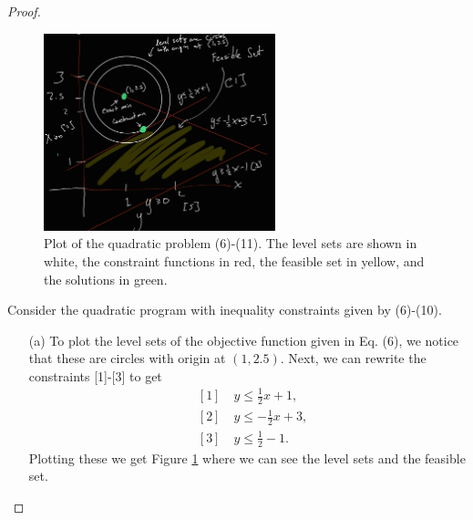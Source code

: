 \documentclass[12pt]{report}
\begin{document}
\begin{problem}
\begin{proof}
\begin{figure}
    \centering
    \includegraphics[width=0.6\textwidth,height=\textwidth,keepaspectratio]{plot.jpg}
    \caption{Plot of the quadratic problem (6)-(11). The level sets are shown in white, the constraint functions in red, the feasible set in yellow, and the solutions in green.}
    \label{fig}
\end{figure}
Consider the quadratic program with inequality constraints given by (6)-(10).
\begin{enumerate}
    \item [(a)]
    To plot the level sets of the objective function given in Eq. (6), we notice that these are circles with origin at $(1,2.5)$. Next, we can rewrite the constraints [1]-[3] to get
    \begin{align*}
        &[1] \quad y \leq \frac{1}{2}x + 1,\\
        &[2] \quad y \leq -\frac{1}{2}x + 3,\\
        &[3] \quad y \leq \frac{1}{2}-1.
    \end{align*}
    Plotting these we get Figure \ref{fig} where we can see the level sets and the feasible set.


\end{enumerate}
\end{proof}
\end{problem}
\end{document}
